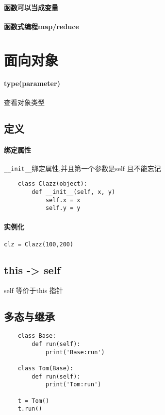 \documentclass[UTF8,a4paper,12pt]{ctexbook}
\begin{document}
		\paragraph{函数可以当成变量}
		
		\paragraph{函数式编程map/reduce}
		
	\section{面向对象}
		\paragraph{type(parameter)} 查看对象类型
		
		\subsection{定义}
			\paragraph{绑定属性}\verb|__init__|绑定属性,并且第一个参数是self 且不能忘记
			
				\begin{lstlisting}
	class Clazz(object):	
		def __init__(self, x, y)
			self.x = x
			self.y = y
				\end{lstlisting}
			
			\paragraph{实例化}\verb|clz = Clazz(100,200)|
			
		\subsection{this -> self}self 等价于this 指针
		
		\subsection{多态与继承}
			\begin{lstlisting}
	class Base:
		def run(self):
			print('Base:run')
			
	class Tom(Base):
		def run(self):
			print('Tom:run')
	
	t = Tom()
	t.run()
			\end{lstlisting}
		
\end{document}
